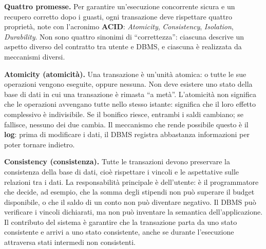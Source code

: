 \documentclass[12pt]{extarticle}
\begin{document}
\noindent \textbf{Quattro promesse.} Per garantire un'esecuzione concorrente sicura e un recupero corretto dopo i guasti, ogni transazione deve rispettare quattro proprietà, note con l'acronimo \textbf{ACID}: \textit{Atomicity}, \textit{Consistency}, \textit{Isolation}, \textit{Durability}. Non sono quattro sinonimi di ``correttezza'': ciascuna descrive un aspetto diverso del contratto tra utente e DBMS, e ciascuna è realizzata da meccanismi diversi.

\medskip
\noindent \textbf{Atomicity (atomicità).} Una transazione è un'unità atomica: o tutte le sue operazioni vengono eseguite, oppure nessuna. Non deve esistere uno stato della base di dati in cui una transazione è rimasta ``a metà''. L'atomicità non significa che le operazioni avvengano tutte nello stesso istante: significa che il loro effetto complessivo è indivisibile. Se il bonifico riesce, entrambi i saldi cambiano; se fallisce, nessuno dei due cambia. Il meccanismo che rende possibile questo è il \textbf{log}: prima di modificare i dati, il DBMS registra abbastanza informazioni per poter tornare indietro.

\medskip
\noindent \textbf{Consistency (consistenza).} Tutte le transazioni devono preservare la consistenza della base di dati, cioè rispettare i vincoli e le aspettative sulle relazioni tra i dati. La responsabilità principale è dell'utente: è il programmatore che decide, ad esempio, che la somma degli stipendi non può superare il budget disponibile, o che il saldo di un conto non può diventare negativo. Il DBMS può verificare i vincoli dichiarati, ma non può inventare la semantica dell'applicazione. Il contributo del sistema è garantire che la transazione parta da uno stato consistente e arrivi a uno stato consistente, anche se durante l'esecuzione attraversa stati intermedi non consistenti.
\end{document}
